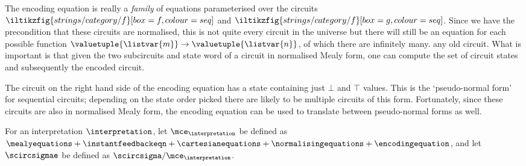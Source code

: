 

\begin{remark}
    The encoding equation is really a \emph{family} of equations parameterised
    over the circuits \(
    \iltikzfig{strings/category/f}[box=f,colour=seq]
    \) and \(
    \iltikzfig{strings/category/f}[box=g,colour=seq]
    \).
    Since we have the precondition that these circuits are normalised, this is
    not quite every circuit in the universe but there will still be an equation
    for each possible function \(
    \valuetuple{\listvar{m}} \to \valuetuple{\listvar{n}}
    \), of which there are infinitely many.
    any old circuit.
    What is important is that given the two subcircuits and state word of a
    circuit in normalised Mealy form, one can compute the set of circuit states
    and subsequently the encoded circuit.
\end{remark}

The circuit on the right hand side of the encoding equation has a state
containing just \(\bot\) and \(\top\) values.
This is the `pseudo-normal form' for sequential circuits; depending on the
state order picked there are likely to be multiple circuits of this form.
Fortunately, since these circuits are also in normalised Mealy form, the
encoding equation can be used to translate between pseudo-normal forms as well.

\begin{definition}
    For an interpretation \(\interpretation\), let
    \(\mce_{\interpretation}\) be defined as \(
    \mealyequations +
    \instantfeedbackeqn +
    \cartesianequations +
    \normalisingequations +
    \encodingequation
    \), and let \(\scircsigmae\) be defined as
    \(\scircsigma / \mce_{\interpretation}\).
\end{definition}

